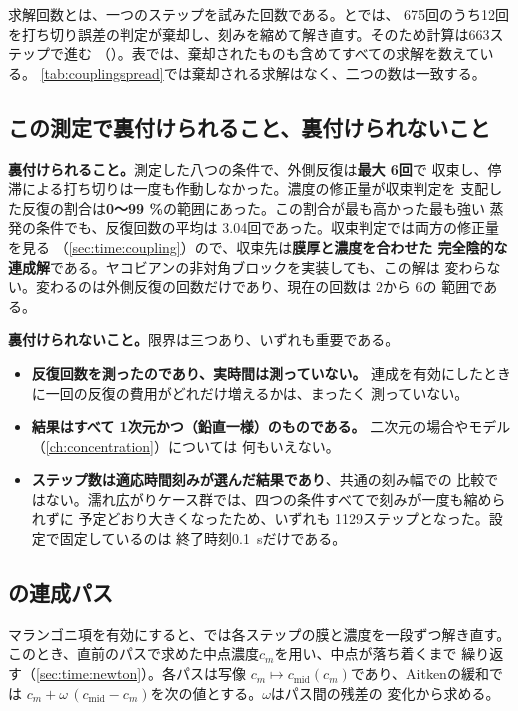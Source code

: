 求解回数とは、一つのステップを試みた回数である。とでは、
675回のうち12回を打ち切り誤差の判定が棄却し、刻みを縮めて解き直す。そのため計算は663ステップで進む
（）。表では、棄却されたものも含めてすべての求解を数えている。
\cref{tab:couplingspread}では棄却される求解はなく、二つの数は一致する。

\subsection{この測定で裏付けられること、裏付けられないこと}

\textbf{裏付けられること。}測定した八つの条件で、外側反復は\textbf{最大 6回}で
収束し、停滞による打ち切りは一度も作動しなかった。濃度の修正量が収束判定を
支配した反復の割合は\textbf{0～99 \%}の範囲にあった。この割合が最も高かった最も強い
蒸発の条件でも、反復回数の平均は 3.04回であった。収束判定では両方の修正量を見る
（\cref{sec:time:coupling}）ので、収束先は\textbf{膜厚と濃度を合わせた
完全陰的な連成解}である。ヤコビアンの非対角ブロックを実装しても、この解は
変わらない。変わるのは外側反復の回数だけであり、現在の回数は 2から 6の
範囲である。

\textbf{裏付けられないこと。}限界は三つあり、いずれも重要である。

\begin{itemize}
  \item \textbf{反復回数を測ったのであり、実時間は測っていない。}
    連成を有効にしたときに一回の反復の費用がどれだけ増えるかは、まったく
    測っていない。
  \item \textbf{結果はすべて 1次元かつ（鉛直一様）のものである。}
    二次元の場合やモデル（\cref{ch:concentration}）については
    何もいえない。
  \item \textbf{ステップ数は適応時間刻みが選んだ結果であり}、共通の刻み幅での
    比較ではない。濡れ広がりケース群では、四つの条件すべてで刻みが一度も縮められずに
    予定どおり大きくなったため、いずれも 1129ステップとなった。設定で固定しているのは
    終了時刻\SI{0.1}{\second}だけである。
\end{itemize}

\subsection{\texorpdfstring{}{CZ}の連成パス}
\label{sec:verification:czpasses}

マランゴニ項を有効にすると、では各ステップの膜と濃度を一段ずつ解き直す。
このとき、直前のパスで求めた中点濃度$c_m$を用い、中点が落ち着くまで
繰り返す（\cref{sec:time:newton}）。各パスは写像
$c_m \mapsto c_{\mathrm{mid}}(c_m)$であり、Aitkenの緩和では
$c_m + \omega\,(c_{\mathrm{mid}} - c_m)$を次の値とする。$\omega$はパス間の残差の
変化から求める。

